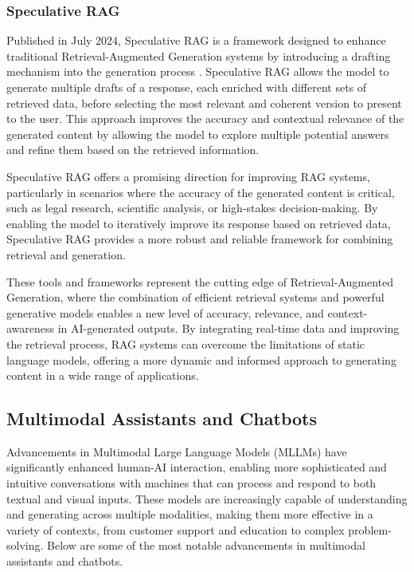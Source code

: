 \subsubsection{Speculative RAG}

Published in July 2024, Speculative RAG is a framework designed to enhance traditional Retrieval-Augmented Generation systems by introducing a drafting mechanism into the generation process \cite{SpeculativeRAG}. 
Speculative RAG allows the model to generate multiple drafts of a response, each enriched with different sets of retrieved data, before selecting the most relevant and coherent version to present to the user. 
This approach improves the accuracy and contextual relevance of the generated content by allowing the model to explore multiple potential answers and refine them based on the retrieved information.

Speculative RAG offers a promising direction for improving RAG systems, particularly in scenarios where the accuracy of the generated content is critical, such as legal research, scientific analysis, or high-stakes decision-making. 
By enabling the model to iteratively improve its response based on retrieved data, Speculative RAG provides a more robust and reliable framework for combining retrieval and generation.

These tools and frameworks represent the cutting edge of Retrieval-Augmented Generation, where the combination of efficient retrieval systems and powerful generative models enables a new level of accuracy, relevance, and context-awareness in AI-generated outputs. 
By integrating real-time data and improving the retrieval process, RAG systems can overcome the limitations of static language models, offering a more dynamic and informed approach to generating content in a wide range of applications.

\subsection{Multimodal Assistants and Chatbots}

Advancements in Multimodal Large Language Models (MLLMs) have significantly enhanced human-AI interaction, enabling more sophisticated and intuitive conversations with machines that can process and respond to both textual and visual inputs. 
These models are increasingly capable of understanding and generating across multiple modalities, making them more effective in a variety of contexts, from customer support and education to complex problem-solving. 
Below are some of the most notable advancements in multimodal assistants and chatbots.

